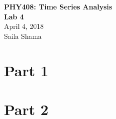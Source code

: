 \documentclass{article}
\begin{document}
\begin{titlepage}
   \begin{center}
      \Large\textbf{PHY408: Time Series Analysis}\\
      \Large\textbf{Lab 4}\\ 
      \vspace{1cm}
      \large{April 4, 2018} \\ 
      \vspace{2cm}
      \large{Saila Shama} \\
	\end{center}
\end{titlepage}

\newpage
\section*{Part 1}
	
\newpage
\section*{Part 2}
	
\newpage
\end{document}
